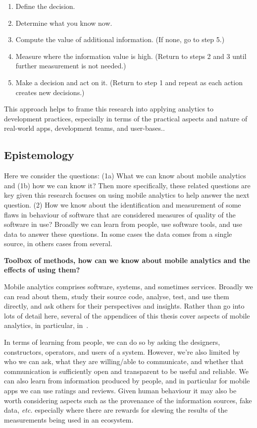 \begin{enumerate}
    \item Define the decision.
    \item Determine what you know now.
    \item Compute the value of additional information. (If none, go to step 5.)
    \item Measure where the information value is high. (Return to steps 2 and 3 until further measurement is not needed.)
    \item Make a decision and act on it. (Return to step 1 and repeat as each action creates new decisions.)
\end{enumerate} %

This approach helps to frame this research into applying analytics to development practices, especially in terms of the practical aspects and nature of real-world apps, development teams, and user-bases..

\subsection{Epistemology}
Here we consider the questions: (1a) What we can know about mobile analytics and (1b) how we can know it? Then more specifically, these related questions are key given this research focuses on using mobile analytics to help answer the next question. (2) How we know about the identification and measurement of some flaws in behaviour of software that are considered measures of quality of the software in use? Broadly we can learn from people, use software tools, and use data to answer these questions. In some cases the data comes from a single source, in others cases from several.

\textbf{Toolbox of methods, how can we know about mobile analytics and the effects of using them?} 

Mobile analytics comprises software, systems, and sometimes services. Broadly we can read about them, study their source code, analyse, test, and use them directly, and ask others for their perspectives and insights. Rather than go into lots of detail here, several of the appendices of this thesis cover aspects of mobile analytics, in particular, in~\href{chapter-on-mobile-analytics}{\emph{}}. 

In terms of learning from people, we can do so by asking the designers, constructors, operators, and users of a system. However, we're also limited by who we can ask, what they are willing/able to communicate, and whether that communication is sufficiently open and transparent to be useful and reliable. We can also learn from information produced by people, and in particular for mobile apps we can use ratings and reviews. Given human behaviour it may also be worth considering aspects such as the provenance of the information sources, fake data, \emph{etc.} especially where there are rewards for slewing the results of the measurements being used in an ecosystem. 

